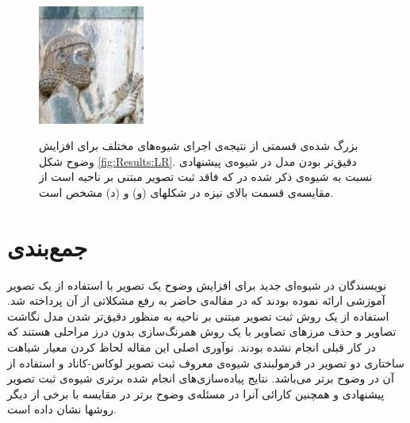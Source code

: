 \documentclass[11pt,a4paper,twocolumn]{article}
\begin{document}
\begin{figure}[t!]
{\includegraphics[width=35mm]{Images/Kamandar_blend_FA-LM-SSIM_Cropped.jpg}}
\hspace{2mm}

\caption{بزرگ شده‌ی قسمتی از نتیجه‌ی اجرای شیوه‌های مختلف برای افزایش وضوح شکل \ref{fig:Results:LR}. دقیق‌تر بودن مدل در شیوه‌ی پیشنهادی نسبت به شیوه‌ی ذکر شده در \cite{Amintoosi08reconstruction} که فاقد ثبت تصویر مبتنی بر ناحیه است از مقایسه‌ی قسمت بالای نیزه در شکلهای (و) و (د) مشخص است.}
\label{fig:Katibeh} %
\end{figure}


\section{جمع‌بندی}\label{Sec:Conclusion}
نویسندگان در \cite{Amintoosi08reconstruction} شیوه‌ای جدید برای افزایش وضوح یک تصویر با استفاده از یک تصویر آموزشی ارائه نموده بودند که در مقاله‌ی حاضر به رفع مشکلاتی از آن پرداخته شد. استفاده از یک روش ثبت تصویر مبتنی بر ناحیه به منظور دقیق‌تر شدن مدل نگاشت تصاویر و حذف مرزهای تصاویر با یک روش همرنگ‌سازی بدون درز مراحلی هستند که در کار قبلی انجام نشده بودند. نوآوری اصلی این مقاله لحاظ کردن معیار شباهت ساختاری دو تصویر در فرمولبندی شیوه‌ی معروف ثبت تصویر لوکاس-کاناد و استفاده از آن در وضوح برتر می‌باشد. نتایج پیاده‌سازی‌های انجام شده برتری شیوه‌ی ثبت تصویر پیشنهادی و همچنین کارائی آنرا در مسئله‌ی وضوح برتر در مقایسه با برخی از دیگر روشها نشان داده است.
\end{document}
